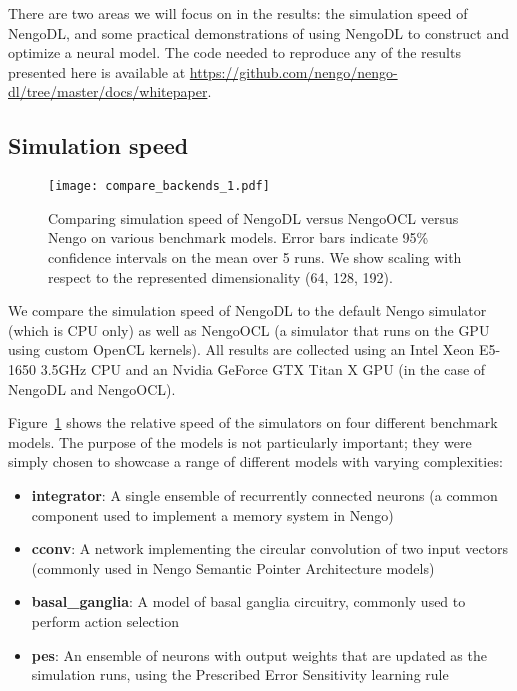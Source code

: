 \documentclass{article}
\begin{document}
There are two areas we will focus on in the results: the simulation speed of NengoDL, and some practical demonstrations of using NengoDL to construct and optimize a neural model.  The code needed to reproduce any of the results presented here is available at \url{https://github.com/nengo/nengo-dl/tree/master/docs/whitepaper}. 

\subsection{Simulation speed}
\label{sec:simulation_speed}

\begin{figure}
\centering
\texttt{[image: compare\_backends\_1.pdf]}
\caption{Comparing simulation speed of NengoDL versus NengoOCL versus Nengo on various benchmark models.  Error bars indicate 95\% confidence intervals on the mean over 5 runs.  We show scaling with respect to the represented dimensionality (64, 128, 192).}
\label{fig:compare_backends_1}
\end{figure}

We compare the simulation speed of NengoDL to the default Nengo simulator (which is CPU only) as well as NengoOCL (a simulator that runs on the GPU using custom OpenCL kernels).  All results are collected using an Intel Xeon E5-1650 3.5GHz CPU and an Nvidia GeForce GTX Titan X GPU (in the case of NengoDL and NengoOCL).

Figure~\ref{fig:compare_backends_1} shows the relative speed of the simulators on four different benchmark models.  The purpose of the models is not particularly important; they were simply chosen to showcase a range of different models with varying complexities:

\begin{itemize}
\item {\bf integrator}: A single ensemble of recurrently connected neurons (a common component used to implement a memory system in Nengo)
\item {\bf cconv}: A network implementing the circular convolution of two input vectors (commonly used in Nengo Semantic Pointer Architecture models)
\item {\bf basal\_ganglia}: A model of basal ganglia circuitry, commonly used to perform action selection
\item {\bf pes}: An ensemble of neurons with output weights that are updated as the simulation runs, using the Prescribed Error Sensitivity learning rule \citep{MacNeil2011}
\end{itemize}
\end{document}
